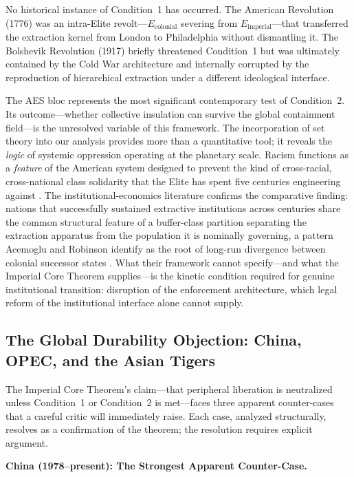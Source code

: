 No historical instance of Condition~1 has occurred. The American Revolution (1776) was an intra-Elite revolt---$E_{\text{colonial}}$ severing from $E_{\text{imperial}}$---that transferred the extraction kernel from London to Philadelphia without dismantling it. The Bolshevik Revolution (1917) briefly threatened Condition~1 but was ultimately contained by the Cold War architecture and internally corrupted by the reproduction of hierarchical extraction under a different ideological interface.

The AES bloc represents the most significant contemporary test of Condition~2. Its outcome---whether collective insulation can survive the global containment field---is the unresolved variable of this framework. The incorporation of set theory into our analysis provides more than a quantitative tool; it reveals the \textit{logic} of systemic oppression operating at the planetary scale. Racism functions as a \textit{feature} of the American system designed to prevent the kind of cross-racial, cross-national class solidarity that the Elite has spent five centuries engineering against \cite{robinson, allen, bonillasilva}. The institutional-economics literature confirms the comparative finding: nations that successfully sustained extractive institutions across centuries share the common structural feature of a buffer-class partition separating the extraction apparatus from the population it is nominally governing, a pattern Acemoglu and Robinson identify as the root of long-run divergence between colonial successor states \cite{acemoglu_robinson}. What their framework cannot specify---and what the Imperial Core Theorem supplies---is the kinetic condition required for genuine institutional transition: disruption of the enforcement architecture, which legal reform of the institutional interface alone cannot supply.

\subsection{The Global Durability Objection: China, OPEC, and the Asian Tigers}

The Imperial Core Theorem's claim---that peripheral liberation is neutralized unless Condition~1 or Condition~2 is met---faces three apparent counter-cases that a careful critic will immediately raise. Each case, analyzed structurally, resolves as a confirmation of the theorem; the resolution requires explicit argument.

\textbf{China (1978--present): The Strongest Apparent Counter-Case.}

